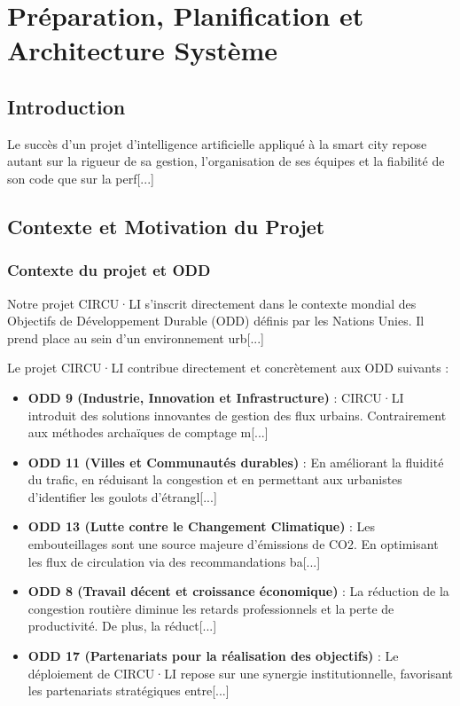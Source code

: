 \chapter{Préparation, Planification et Architecture Système}

\section{Introduction}
Le succès d'un projet d'intelligence artificielle appliqué à la smart city repose autant sur la rigueur de sa gestion, l'organisation de ses équipes et la fiabilité de son code que sur la perf[...]

\section{Contexte et Motivation du Projet}

\subsection{Contexte du projet et ODD}
Notre projet CIRCU·LI s’inscrit directement dans le contexte mondial des Objectifs de Développement Durable (ODD) définis par les Nations Unies. Il prend place au sein d’un environnement urb[...]

Le projet CIRCU·LI contribue directement et concrètement aux ODD suivants :
\begin{itemize}
    \item \textbf{ODD 9 (Industrie, Innovation et Infrastructure)} : CIRCU·LI introduit des solutions innovantes de gestion des flux urbains. Contrairement aux méthodes archaïques de comptage m[...]
    \item \textbf{ODD 11 (Villes et Communautés durables)} : En améliorant la fluidité du trafic, en réduisant la congestion et en permettant aux urbanistes d'identifier les goulots d'étrangl[...]
    \item \textbf{ODD 13 (Lutte contre le Changement Climatique)} : Les embouteillages sont une source majeure d'émissions de CO2. En optimisant les flux de circulation via des recommandations ba[...]
    \item \textbf{ODD 8 (Travail décent et croissance économique)} : La réduction de la congestion routière diminue les retards professionnels et la perte de productivité. De plus, la réduct[...]
    \item \textbf{ODD 17 (Partenariats pour la réalisation des objectifs)} : Le déploiement de CIRCU·LI repose sur une synergie institutionnelle, favorisant les partenariats stratégiques entre[...]
\end{itemize}

